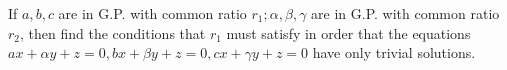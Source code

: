 \item If $a, b, c$ are in G.P. with common ratio $r_1; \alpha, \beta, \gamma$ are in G.P. with common ratio $r_2$, then find the
  conditions that $r_1$ must satisfy in order that the equations $ax + \alpha y + z = 0, bx + \beta y + z = 0, cx + \gamma y + z =
  0$ have only trivial solutions.
\stopitemize
